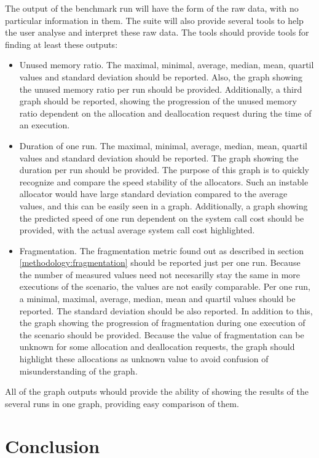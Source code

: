 The output of the benchmark run will have the form of the raw data, with no particular information in them. The suite will also provide several tools to help the user analyse and interpret these raw data. The tools should provide tools for finding at least these outputs:
\begin{itemize}
\item Unused memory ratio. The maximal, minimal, average, median, mean, quartil values and standard deviation should be reported. Also, the graph showing the unused memory ratio per run should be provided. Additionally, a third graph should be reported, showing the progression of the unused memory ratio dependent on the allocation and deallocation request during the time of an execution.
\item Duration of one run. The maximal, minimal, average, median, mean, quartil values and standard deviation should be reported. The graph showing the duration per run should be provided. The purpose of this graph is to quickly recognize and compare the speed stability of the allocators. Such an instable allocator would have large standard deviation compared to the average values, and this can be easily seen in a graph. Additionally, a graph showing the predicted speed of one run dependent on the system call cost should be provided, with the actual average system call cost highlighted.
\item Fragmentation. The fragmentation metric found out as described in section \ref{methodology:fragmentation} should be reported just per one run. Because the number of measured values need not necesarilly stay the same in more executions of the scenario, the values are not easily comparable. Per one run, a minimal, maximal, average, median, mean and quartil values should be reported. The standard deviation should be also reported. In addition to this, the graph showing the progression of fragmentation during one execution of the scenario should be provided. Because the value of fragmentation can be unknown for some allocation and deallocation requests, the graph should highlight these allocations as unknown value to avoid confusion of misunderstanding of the graph.
\end{itemize}

All of the graph outputs whould provide the ability of showing the results of the several runs in one graph, providing easy comparison of them.
\chapter{Conclusion}

